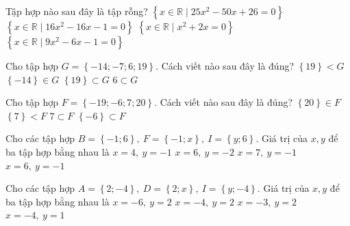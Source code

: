 \begin{ex}
 Tập hợp nào sau đây là tập rỗng? 
\choice
{ \True $\left\{x\in\mathbb{R}\mid 25 x^{2} - 50 x + 26=0\right\}$ }
   { $\left\{x\in\mathbb{R}\mid 16 x^{2} - 16 x - 1=0\right\}$ }
     { $\left\{x\in\mathbb{R}\mid x^{2} + 2 x=0\right\}$ }
    { $\left\{x\in\mathbb{R}\mid 9 x^{2} - 6 x - 1=0\right\}$ }
\end{ex}

\begin{ex}
 Cho tập hợp ${G}=\left\{-14;-7;6;19\right\}$. Cách viết nào sau đây là đúng? 
\choice
{ $\left\{19\right\}<G$ }
   { $\left\{-14\right\}\in G$ }
     { \True $\left\{19\right\}\subset G$ }
    { $6\subset G$ }
\end{ex}

\begin{ex}
 Cho tập hợp ${F}=\left\{-19;-6;7;20\right\}$. Cách viết nào sau đây là đúng? 
\choice
{ $\left\{20\right\}\in F$ }
   { $\left\{7\right\}<F$ }
     { $7\subset F$ }
    { \True $\left\{-6\right\}\subset F$ }
\end{ex}

\begin{ex}
 Cho các tập hợp $B=\left\{-1;6\right\},\ F=\left\{-1;x\right\},\ I=\left\{y;6\right\}$. Giá trị của ${x},{y}$ để ba tập hợp bằng nhau là 
\choice
{ $x=4,\ y=-1$ }
   { $x=6,\ y=-2$ }
     { $x=7,\ y=-1$ }
    { \True $x=6,\ y=-1$ }
\end{ex}

\begin{ex}
 Cho các tập hợp $A=\left\{2;-4\right\},\ D=\left\{2;x\right\},\ I=\left\{y;-4\right\}$. Giá trị của ${x},{y}$ để ba tập hợp bằng nhau là 
\choice
{ $x=-6,\ y=2$ }
   { \True $x=-4,\ y=2$ }
     { $x=-3,\ y=2$ }
    { $x=-4,\ y=1$ }
\end{ex}

